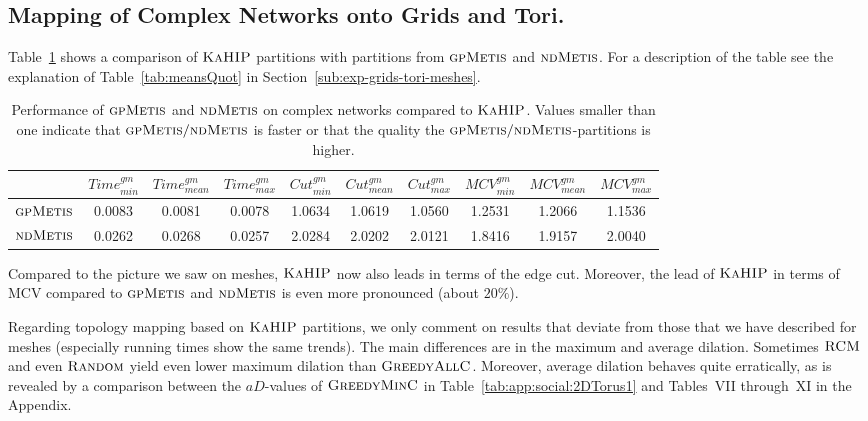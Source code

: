 \documentclass[pdftex]{llncs}
\newcommand{\gpmetis}{\textsc{gpMetis}\xspace}
\newcommand{\ndmetis}{\textsc{ndMetis}\xspace}
\newcommand{\kahip}{\textsc{KaHIP}\xspace}
\newcommand{\random}{\textsc{Random}\xspace}
\newcommand{\rcm}{\textsc{RCM}\xspace}
\newcommand{\greedyallc}{\textsc{GreedyAllC}\xspace}
\newcommand{\greedyminc}{\textsc{GreedyMinC}\xspace}
\begin{document}
\subsection{Mapping of Complex Networks onto Grids and Tori.}
\label{sub:exp-complex-grids-tori}

Table~\ref{tab:meansQuotComplex} shows a comparison of
$\kahip$ partitions with partitions from $\gpmetis$ and
$\ndmetis$. For a description of the table see the explanation of
Table~\ref{tab:meansQuot} in Section~\ref{sub:exp-grids-tori-meshes}.

\begin{table}[htb]
  \caption{Performance of $\gpmetis$ and $\ndmetis$ on complex
    networks compared to $\kahip$. Values smaller than one indicate
    that $\gpmetis\slash\ndmetis$ is faster or that the quality the
    $\gpmetis\slash\ndmetis$-partitions is higher.}
\begin{center}
\begin{tabular}{ l | c c c | c c c | c c c}
           & $Time^{gm}_{min}$ & $Time^{gm}_{mean}$ &
    $Time^{gm}_{max}$ & $Cut^{gm}_{min}$ & $Cut^{gm}_{mean}$ &
    $Cut^{gm}_{max}$ & $MCV^{gm}_{min}$ & $MCV^{gm}_{mean}$ &
    $MCV^{gm}_{max}$ \\\hline \hline
    $\gpmetis$ & 0.0083 & 0.0081 & 0.0078 & 1.0634 & 1.0619 & 1.0560 & 1.2531 & 1.2066 & 1.1536\\
    $\ndmetis$ & 0.0262 & 0.0268 & 0.0257 & 2.0284 & 2.0202 & 2.0121 & 1.8416 & 1.9157 & 2.0040
\end{tabular}
\end{center}
\label{tab:meansQuotComplex}
\end{table}

Compared to the picture we saw on meshes, $\kahip$ now also leads in
terms of the edge cut. Moreover, the lead of $\kahip$ in terms of MCV
compared to $\gpmetis$ and $\ndmetis$ is even more pronounced (about
$20\%$).

Regarding topology mapping based on $\kahip$ partitions, we only
comment on results that deviate from those that we have described for
meshes (especially running times show the same trends). The main
differences are in the maximum and average dilation. Sometimes $\rcm$
and even $\random$ yield even lower maximum dilation than
$\greedyallc$. Moreover, average dilation behaves quite erratically,
as is revealed by a comparison between the $aD$-values of
$\greedyminc$ in Table~\ref{tab:app:social:2DTorus1} and
Tables~VII through~XI in the Appendix.
\end{document}
